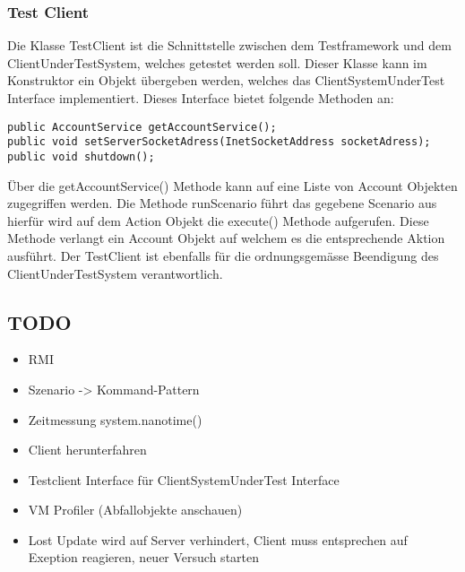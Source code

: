 \subsubsection{Test Client}
\label{sec:testclient}
Die Klasse TestClient ist die Schnittstelle zwischen dem Testframework und dem ClientUnderTestSystem, welches getestet werden soll. Dieser Klasse kann im Konstruktor ein Objekt übergeben werden, welches das ClientSystemUnderTest Interface implementiert. Dieses Interface bietet folgende Methoden an:
\begin{lstlisting}
public AccountService getAccountService();
public void setServerSocketAdress(InetSocketAddress socketAdress);
public void shutdown();
\end{lstlisting}	
Über die getAccountService() Methode kann auf eine Liste von Account Objekten zugegriffen werden. Die Methode runScenario führt das gegebene Scenario aus hierfür wird auf dem Action Objekt die execute() Methode aufgerufen. Diese Methode verlangt ein Account Objekt auf welchem es die entsprechende Aktion ausführt. Der TestClient ist ebenfalls für die ordnungsgemässe Beendigung des ClientUnderTestSystem verantwortlich.


\subsection{TODO}
\begin{itemize}
\item RMI
\item Szenario -> Kommand-Pattern
\item Zeitmessung system.nanotime()
\item Client herunterfahren
\item Testclient Interface für ClientSystemUnderTest Interface
\item VM Profiler (Abfallobjekte anschauen)
\item Lost Update wird auf Server verhindert, Client muss entsprechen auf Exeption reagieren, neuer Versuch starten
\end{itemize}


